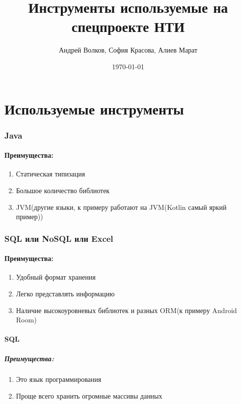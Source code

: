 \documentclass[a4paper, 12pt]{article}
\author{Андрей Волков, София Красова, Алиев Марат}
\title{Инструменты используемые на спецпроекте НТИ\cite{NTI}}
\date{\today}
\begin{document}
	\maketitle
	\part{Используемые инструменты}
	\section{Java\cite{Java}}
	\subsection{Преимущества:}
		\begin{enumerate}
			\item Статическая типизация
			\item Большое количество библиотек
			\item JVM\cite{JVM}(другие языки, к примеру работают на JVM\cite{JVM}(Kotlin\cite{Kotlin} самый яркий пример))
		\end{enumerate}

	\section{SQL\cite{SQL} или NoSQL\cite{NoSQL} или Excel\cite{Excel}}
	\subsection{Преимущества:}
		\begin{enumerate}
			\item Удобный формат хранения
			\item Легко представлять информацию
			\item Наличие высокоуровневых библиотек и разных ORM\cite{ORM}(к примеру Android Room\cite{Room})
		\end{enumerate}
	\subsection{SQL\cite{SQL}}
		\subsubsection{Преимущества:}
			\begin{enumerate}
				\item Это язык программирования
				\item Проще всего хранить огромные массивы данных
			\end{enumerate}
\end{document}

